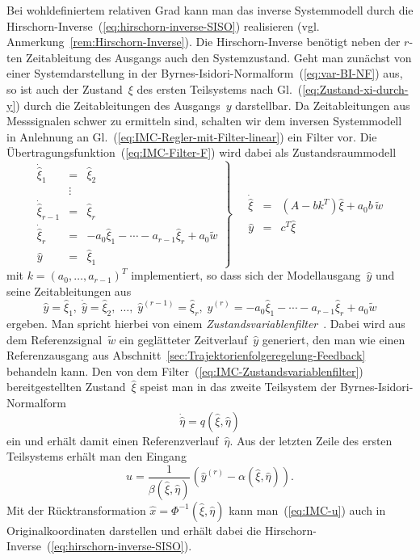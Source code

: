Bei wohldefiniertem relativen Grad kann man das inverse Systemmodell
durch die Hirschorn-Inverse~(\ref{eq:hirschorn-inverse-SISO})
realisieren (vgl. Anmerkung~\ref{rem:Hirschorn-Inverse}). Die Hirschorn-Inverse
benötigt neben der $r$-ten Zeitableitung des Ausgangs auch den Systemzustand.
Geht man zunächst von einer Systemdarstellung in der Byrnes-Isidori-Normalform~(\ref{eq:var-BI-NF})
aus, so ist auch der Zustand~$\xi$ des ersten Teilsystems nach Gl.~(\ref{eq:Zustand-xi-durch-y})
durch die Zeitableitungen des Ausgangs~$y$ darstellbar. Da Zeitableitungen
aus Mess\-signalen schwer zu ermitteln sind, schalten wir dem inversen
Systemmodell in Anlehnung an Gl.~(\ref{eq:IMC-Regler-mit-Filter-linear})
ein Filter vor. Die Übertragungsfunktion~(\ref{eq:IMC-Filter-F})
wird dabei als Zustandsraummodell 
\begin{equation}
\left.\begin{array}{lcl}
\dot{\hat{\xi}}_{1} & = & \hat{\xi}_{2}\\
 & \vdots\\
\dot{\hat{\xi}}_{r-1} & = & \hat{\xi}_{r}\\
\dot{\hat{\xi}}_{r} & = & -a_{0}\hat{\xi}_{1}-\cdots-a_{r-1}\hat{\xi}_{r}+a_{0}\tilde{w}\\
\hat{y} & = & \hat{\xi}_{1}
\end{array}\right\} \quad\begin{array}{lcl}
\dot{\hat{\xi}} & = & \left(A-bk^{T}\right)\hat{\xi}+a_{0}b\,\tilde{w}\\
\hat{y} & = & c^{T}\hat{\xi}
\end{array}\label{eq:IMC-Zustandsvariablenfilter}
\end{equation}
mit $k=(a_{0},\ldots,a_{r-1})^{T}$ implementiert, so dass sich der
Modellausgang~$\hat{y}$ und seine Zeitableitungen aus 
\[
\hat{y}=\hat{\xi}_{1},\;\dot{\hat{y}}=\hat{\xi}_{2},\;\ldots,\;\hat{y}^{(r-1)}=\hat{\xi}_{r},\;\hat{y}^{(r)}=-a_{0}\hat{\xi}_{1}-\cdots-a_{r-1}\hat{\xi}_{r}+a_{0}\tilde{w}
\]
ergeben. Man spricht hierbei von einem \emph{Zustandsvariablenfilter}~\cite{isermann2}.
Dabei wird aus dem Referenzsignal~$\tilde{w}$ ein geglätteter Zeitverlauf~$\hat{y}$
generiert, den man wie einen Referenzausgang aus Abschnitt~\ref{sec:Trajektorienfolgeregelung-Feedback}
behandeln kann. Den von dem Filter~(\ref{eq:IMC-Zustandsvariablenfilter})
bereitgestellten Zustand~$\hat{\xi}$ speist man in das zweite Teilsystem
der Byrnes-Isidori-Normalform
\[
\dot{\hat{\eta}}=q(\hat{\xi},\hat{\eta})
\]
ein und erhält damit einen Referenzverlauf~$\hat{\eta}$. Aus der
letzten Zeile des ersten Teilsystems erhält man den Eingang 
\begin{equation}
u=\frac{1}{\beta(\hat{\xi},\hat{\eta})}\left(\hat{y}^{(r)}-\alpha(\hat{\xi},\hat{\eta})\right).\label{eq:IMC-u}
\end{equation}
Mit der Rücktransformation $\hat{x}=\Phi^{-1}(\hat{\xi},\hat{\eta})$
kann man~(\ref{eq:IMC-u}) auch in Originalkoordinaten darstellen
und erhält dabei die Hirschorn-Inverse~(\ref{eq:hirschorn-inverse-SISO}).

